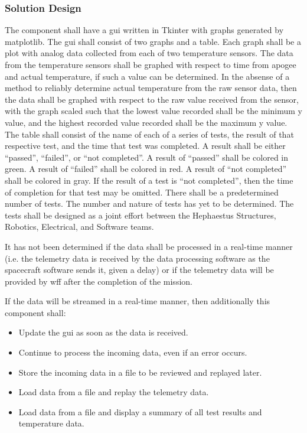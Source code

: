 \documentclass[letterpaper,10pt]{article}
\begin{document}
\subsubsection{Solution Design}
The component shall have a \gls{gui} written in Tkinter with graphs generated by
\gls{matplotlib}.
The \gls{gui} shall consist of two graphs and a table.
Each graph shall be a \gls{plot} with analog data collected from each of two temperature sensors.
The data from the temperature sensors shall be graphed with respect to time from
\gls{apogee} and actual temperature, if such a value can be determined.
In the absense of a method to reliably determine actual temperature from the raw
sensor data, then the data shall be graphed with respect to the raw value received
from the sensor, with the graph scaled such that the lowest value recorded shall be
the minimum y value, and the highest recorded value recorded shall be the maximum y value.
The table shall consist of the name of each of a series of tests,
the result of that respective test, and the time that test was completed.
A result shall be either ``passed'', ``failed'', or ``not completed''.
A result of ``passed'' shall be colored in green.
A result of ``failed'' shall be colored in red.
A result of ``not completed'' shall be colored in gray.
If the result of a test is ``not completed'', then the time of completion for that test
may be omitted.
There shall be a predetermined number of tests.
The number and nature of tests has yet to be determined.
The tests shall be designed as a joint effort between the Hephaestus Structures,
Robotics, Electrical, and Software teams.

It has not been determined if the data shall be processed in a real-time manner
(i.e. the telemetry data is received by the data processing software as the
spacecraft software sends it, given a delay) or if the telemetry data will be provided
by \gls{wff} after the completion of the mission.

If the data will be streamed in a real-time manner, then additionally this component shall:
\begin{itemize}
\item Update the \gls{gui} as soon as the data is received.
\item Continue to process the incoming data, even if an error occurs.
\item Store the incoming data in a file to be reviewed and \gls{replay}ed later.
\item Load data from a file and \gls{replay} the telemetry data.
\item Load data from a file and display a summary of all test results and
temperature data.
\end{itemize}
\end{document}
